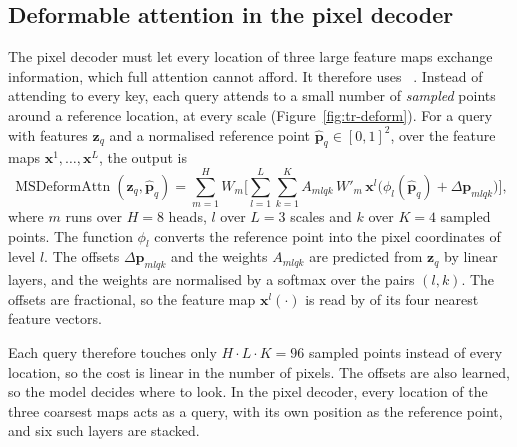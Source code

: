 \subsection{Deformable attention in the pixel decoder}\label{sec:tr-deform}
The pixel decoder must let every location of three large feature maps exchange information, which
full attention cannot afford. It therefore uses ~\citep{deformabledetr}. Instead of attending to every key, each query attends to a small
number of \emph{sampled} points around a reference location, at every scale
(Figure~\ref{fig:tr-deform}). For a query with features $\mathbf{z}_q$ and a normalised reference point
$\hat{\mathbf{p}}_q\in[0,1]^2$, over the feature maps $\mathbf{x}^1,\dots,\mathbf{x}^L$, the output is
\begin{equation}
\operatorname{MSDeformAttn}(\mathbf{z}_q, \hat{\mathbf{p}}_q)
= \sum_{m=1}^{H} W_m \Big[\sum_{l=1}^{L}\sum_{k=1}^{K} A_{mlqk}\,
W'_m\,\mathbf{x}^{l}\big(\phi_l(\hat{\mathbf{p}}_q) + \Delta\mathbf{p}_{mlqk}\big)\Big],
\label{eq:tr-deform}
\end{equation}
where $m$ runs over $H=8$ heads, $l$ over $L=3$ scales and $k$ over $K=4$ sampled points. The function
$\phi_l$ converts the reference point into the pixel coordinates of level $l$. The offsets
$\Delta\mathbf{p}_{mlqk}$ and the weights $A_{mlqk}$ are predicted from $\mathbf{z}_q$ by linear layers,
and the weights are normalised by a softmax over the pairs $(l,k)$. The offsets are fractional, so the
feature map $\mathbf{x}^l(\cdot)$ is read by  of its four nearest
feature vectors.

Each query therefore touches only $H\cdot L\cdot K = 96$ sampled points instead of every location, so
the cost is linear in the number of pixels. The offsets are also learned, so the model decides where
to look. In the pixel decoder, every location of the three coarsest maps acts as a query, with
its own position as the reference point, and six such layers are stacked.

